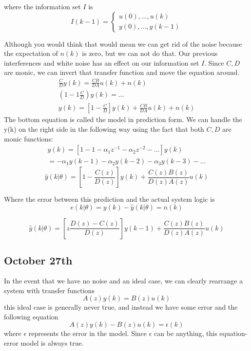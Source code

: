 \documentclass[11pt]{article}
\begin{document}
where the information set $I$ is 
\begin{equation}
    I(k-1) = 
    \begin{cases}
       u(0), \dots, u(k) \\
       y(0), \dots, y(k-1)
    \end{cases}
\end{equation}

Although you would think that would mean we can get rid of the noise because the expectation of $n(k)$ is zero, but we can not do that.
Our previous interferences and white noise has an effect on our information set $I$.
Since $C,D$ are monic, we can invert that transfer function and move the equation around.
\begin{gather}
    \frac{C}{D}y(k) = \frac{C B}{D A} u(k) + n(k)\\
    (1-1 \frac{C}{D}) y(k) = \dots \\
    y(k) = [1-\frac{C}{D}]y(k) + \frac{C B}{D A} u(k) + n(k)
\end{gather}
The bottom equation is called the model in prediction form.
We can handle the y(k) on the right side in the following way using the fact that both $C,D$ are monic functions:
\begin{gather}
    [1-\frac{C}{D}]y(k) = [1-1 - \alpha_1 z^{-1} - \alpha_2 z^{-2} - \dots] y(k) \\
    = -\alpha_1 y(k-1) - \alpha_2 y(k-2) - \alpha_3 y(k-3) - \dots
\end{gather}
\begin{equation}
    \hat{y}(k|\theta) = [1- \frac{C(z)}{D(z)}]y(k) + \frac{C(z) B(z)}{D(z) A(z)} u(k)
\end{equation}

Where the error between this prediction and the actual system logic is
\begin{equation}
    e(k|\theta) = y(k) - \hat{y}(k|\theta) = n(k)
\end{equation}

\begin{equation}
    \hat{y} (k | \theta) = [z \frac{D(z) - C(z)}{D(z)}] y(k-1) + \frac{C(z) B(z)}{D(z) A(z)} u(k)
\end{equation}

\subsection{October 27th}
In the event that we have no noise and an ideal case, we can clearly rearrange a system with transfer functions
\begin{equation}
    A(z) y(k) = B(z) u(k)
\end{equation}
this ideal case is generally never true, and instead we have some error and the following equation
\begin{equation}
    A(z) y(k) - B(z) u(k) = \epsilon (k)
\end{equation}
where $\epsilon$ represents the error in the model.
Since $\epsilon$ can be anything, this equation-error model is always true.
\end{document}
